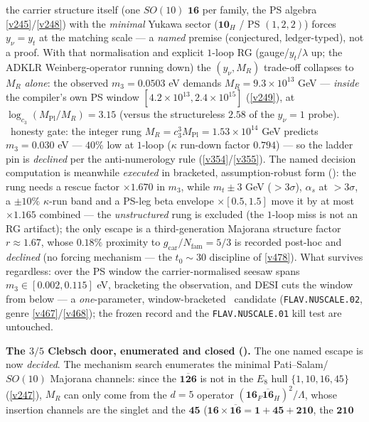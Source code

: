\documentclass[11pt,a4paper]{article}
\newcommand{\Mpl}{M_{\mathrm{Pl}}}
\newcommand{\gcar}{g_{\mathrm{car}}}
\newcommand{\Nfam}{N_{\mathrm{fam}}}
\theoremstyle{definition}
\begin{document}
the carrier structure itself (one $SO(10)$ $\mathbf{16}$ per family, the PS algebra \vref{v245}/\vref{v248})
with the \emph{minimal} Yukawa sector ($\mathbf{10}_H$ / PS $(1,2,2)$) forces $y_\nu=y_t$ at the matching scale
--- a \emph{named} premise (conjectured, ledger-typed), not a proof. With that normalisation and explicit $1$-loop RG
(gauge/$y_t$/$\lambda$ up; the ADKLR Weinberg-operator running down) the $(y_\nu,M_R)$ trade-off collapses to
$M_R$ \emph{alone}: the observed $m_3{=}0.0503$ eV demands $M_R=9.3{\times}10^{13}$ GeV --- \emph{inside} the
compiler's own PS window $[4.2{\times}10^{13},2.4{\times}10^{15}]$ (\vref{v249}), at
$\log_{c_3}(\Mpl/M_R)=3.15$ (versus the structureless $2.58$ of the $y_\nu{=}1$ probe). \mX\ honesty gate: the
integer rung $M_R=c_3^3\Mpl=1.53{\times}10^{14}$ GeV predicts $m_3=0.030$ eV --- $40\%$ low at $1$-loop
($\kappa$ run-down factor $0.794$) --- so the ladder pin is \emph{declined} per the anti-numerology rule
(\vref{v354}/\vref{v355}). The named decision computation is meanwhile \emph{executed} in bracketed,
assumption-robust form (): the rung needs a rescue factor
$\times1.670$ in $m_3$, while $m_t\pm3$ GeV ($>3\sigma$), $\alpha_s$ at $>3\sigma$, a $\pm10\%$
$\kappa$-run band and a PS-leg beta envelope $\times[0.5,1.5]$ move it by at most $\times1.165$
combined --- the \emph{unstructured} rung is excluded (the $1$-loop miss is not an RG artifact); the
only escape is a third-generation Majorana structure factor $r\approx1.67$, whose $0.18\%$ proximity to
$\gcar/\Nfam=5/3$ is recorded post-hoc and \emph{declined} (no forcing mechanism --- the $t_0{\sim}30$
discipline of \vref{v478}). What survives regardless: over the PS window the carrier-normalised seesaw spans
$m_3\in[0.002,0.115]$ eV, bracketing the observation, and DESI cuts the window from below --- a
\emph{one}-parameter, window-bracketed \mO\ candidate (\texttt{FLAV.NUSCALE.02}, genre
\vref{v467}/\vref{v468}); the frozen record and the \texttt{FLAV.NUSCALE.01} kill test are untouched.
\par\smallskip\noindent\textbf{The $3/5$ Clebsch door, enumerated and closed
().} The one named escape is now \emph{decided}. The mechanism search
enumerates the minimal Pati--Salam/$SO(10)$ Majorana channels: since the $\overline{\mathbf{126}}$ is not in the
$E_8$ hull $\{1,10,16,45\}$ (\vref{v247}), $M_R$ can only come from the $d{=}5$ operator
$(\mathbf{16}_F\overline{\mathbf{16}}_H)^2/\Lambda$, whose insertion channels are the singlet and the
$\mathbf{45}$ ($\mathbf{16}\times\overline{\mathbf{16}}=\mathbf{1}+\mathbf{45}+\mathbf{210}$, the $\mathbf{210}$
\end{document}
